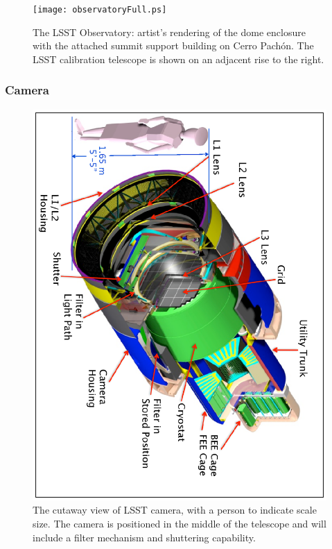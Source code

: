 \documentclass{emulateapj}
\begin{document}
\begin{figure}
\vskip -1.3in
\texttt{[image: observatoryFull.ps]}
\vskip -1.4in
\caption{The LSST Observatory: artist's rendering of the dome enclosure 
with the attached summit support building on Cerro Pach\'{o}n. The LSST calibration 
telescope is shown on an adjacent rise to the right.} 
\label{Fig:observatory}
\end{figure}



\vskip 0.2in
\subsubsection{ Camera }


\begin{figure}[t!]
\hskip -1.7in
\includegraphics[width=1.55\hsize,angle=90.0,clip]{camera2009.ps}
\vskip -2.5in
\caption{The cutaway view of LSST camera, with a person to indicate scale size. 
The camera is positioned in the middle of the telescope and will include a filter 
mechanism and shuttering capability.} 
\label{Fig:camera}
\end{figure}
\end{document}
